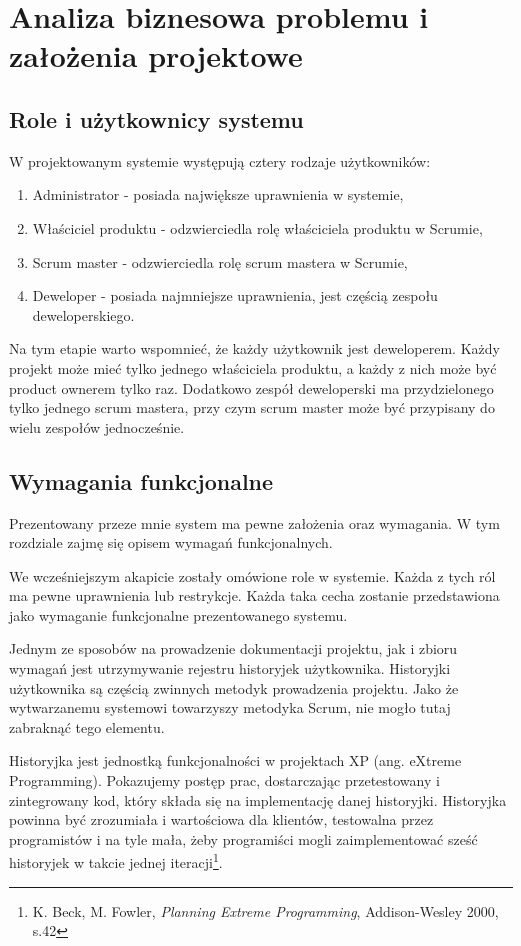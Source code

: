 \chapter{Analiza biznesowa problemu i założenia projektowe}

\section{Role i użytkownicy systemu}
W projektowanym systemie występują cztery rodzaje użytkowników:

\begin{enumerate}
	\item Administrator - posiada największe uprawnienia w systemie,
	\item Właściciel produktu - odzwierciedla rolę właściciela produktu w Scrumie,
	\item Scrum master - odzwierciedla rolę scrum mastera w Scrumie,
	\item Deweloper - posiada najmniejsze uprawnienia, jest częścią zespołu deweloperskiego.
\end{enumerate} 

Na tym etapie warto wspomnieć, że każdy użytkownik jest deweloperem. Każdy projekt może mieć tylko jednego właściciela produktu, a każdy z nich może być product ownerem tylko raz. Dodatkowo zespół deweloperski ma przydzielonego tylko jednego scrum mastera, przy czym scrum master może być przypisany do wielu zespołów jednocześnie.

\section{Wymagania funkcjonalne}
Prezentowany przeze mnie system ma pewne założenia oraz wymagania. W tym rozdziale zajmę się opisem wymagań funkcjonalnych. 

We wcześniejszym akapicie zostały omówione role w systemie. Każda z tych ról ma pewne uprawnienia lub restrykcje. Każda taka cecha zostanie przedstawiona jako wymaganie funkcjonalne prezentowanego systemu.

Jednym ze sposobów na prowadzenie dokumentacji projektu, jak i zbioru wymagań jest utrzymywanie rejestru historyjek użytkownika. Historyjki użytkownika są częścią zwinnych metodyk prowadzenia projektu. Jako że wytwarzanemu systemowi towarzyszy metodyka Scrum, nie mogło tutaj zabraknąć tego elementu.

\begin{italicquote}
	Historyjka jest jednostką funkcjonalności w projektach XP (ang. eXtreme Programming). Pokazujemy postęp prac, dostarczając przetestowany i zintegrowany kod, który składa się na implementację danej historyjki. Historyjka powinna być zrozumiała i wartościowa dla klientów, testowalna przez programistów i na tyle mała, żeby programiści mogli zaimplementować sześć historyjek w takcie jednej iteracji\footnote{K. Beck, M. Fowler, \textit{Planning Extreme Programming}, Addison-Wesley 2000, s.42}.
\end{italicquote}

